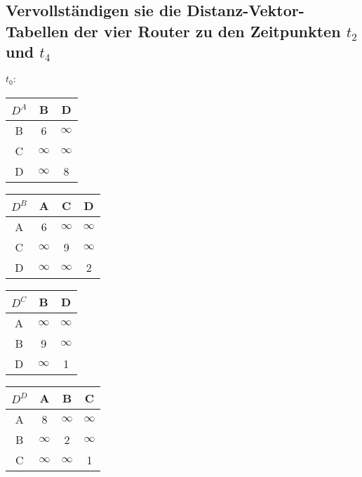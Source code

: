 \documentclass[a4paper]{article}
\begin{document}
\subsection{Vervollständigen sie die Distanz-Vektor-Tabellen der vier Router zu den Zeitpunkten $t_2$ und $t_4$} 
\paragraph{$t_0:$}
\begin{center}
  \begin{tabular}{|c|c|c|}
    \hline
    $D^A$ & B & D \\ \hline
    B & 6 & $\infty$ \\ \hline
    C & $\infty$ & $\infty$ \\ \hline
    D & $\infty$ & 8 \\
    \hline
  \end{tabular}
  \begin{tabular}{|c|c|c|c|}
    \hline
    $D^B$ & A & C & D \\ \hline
    A & 6 & $\infty$ & $\infty$ \\ \hline
    C & $\infty$ &9 & $\infty$ \\ \hline
    D & $\infty$ & $\infty$ & 2 \\
    \hline
  \end{tabular}
  \begin{tabular}{|c|c|c|}
    \hline
    $D^C$ & B & D \\ \hline
    A & $\infty$ & $\infty$ \\ \hline
    B & 9 & $\infty$ \\ \hline
    D & $\infty$ & 1 \\
    \hline
  \end{tabular}
  \begin{tabular}{|c|c|c|c|}
    \hline
    $D^D$ & A & B & C \\ \hline
    A & 8 & $\infty$ & $\infty$ \\ \hline
    B & $\infty$ &2 & $\infty$ \\ \hline
    C & $\infty$ & $\infty$ & 1 \\
    \hline
  \end{tabular}
\end{center}
\end{document}
